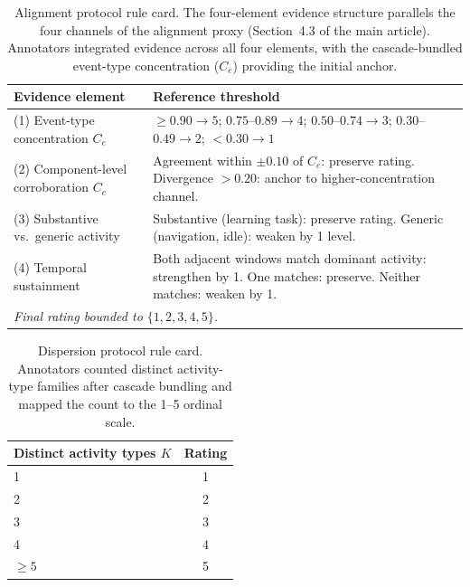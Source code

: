 \documentclass[preprint,12pt,authoryear]{elsarticle}
\begin{document}
\begin{table}[h]
\centering
\caption{Alignment protocol rule card. The four-element evidence structure parallels the four channels of the alignment proxy (Section~4.3 of the main article). Annotators integrated evidence across all four elements, with the cascade-bundled event-type concentration ($C_e$) providing the initial anchor.}
\label{tab:annot-alignment}
\begin{tabular}{lp{8cm}}
\hline
Evidence element & Reference threshold \\
\hline
(1) Event-type concentration $C_e$ & $\geq 0.90 \to 5$; $0.75$--$0.89 \to 4$; $0.50$--$0.74 \to 3$; $0.30$--$0.49 \to 2$; $< 0.30 \to 1$ \\
(2) Component-level corroboration $C_c$ & Agreement within $\pm 0.10$ of $C_e$: preserve rating. Divergence $> 0.20$: anchor to higher-concentration channel. \\
(3) Substantive vs.\ generic activity & Substantive (learning task): preserve rating. Generic (navigation, idle): weaken by 1 level. \\
(4) Temporal sustainment & Both adjacent windows match dominant activity: strengthen by 1. One matches: preserve. Neither matches: weaken by 1. \\
\hline
\multicolumn{2}{l}{\textit{Final rating bounded to $\{1, 2, 3, 4, 5\}$.}} \\
\hline
\end{tabular}
\end{table}

\begin{table}[h]
\centering
\caption{Dispersion protocol rule card. Annotators counted distinct activity-type families after cascade bundling and mapped the count to the 1--5 ordinal scale.}
\label{tab:annot-dispersion}
\begin{tabular}{lc}
\hline
Distinct activity types $K$ & Rating \\
\hline
1 & 1 \\
2 & 2 \\
3 & 3 \\
4 & 4 \\
$\geq 5$ & 5 \\
\hline
\end{tabular}
\end{table}
\end{document}
